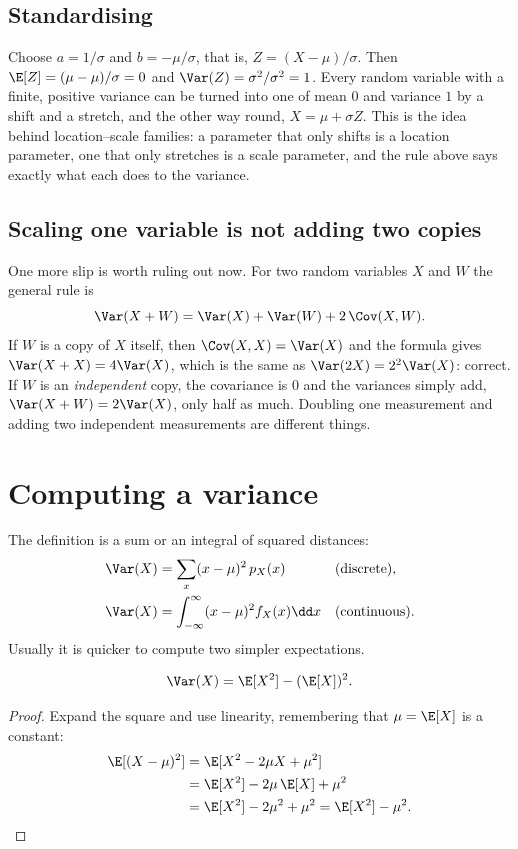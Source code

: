 \subsection{Standardising}

Choose $a=1/\sigma$ and $b=-\mu/\sigma$, that is, $Z=(X-\mu)/\sigma$. Then $\E[Z]=(\mu-\mu)/\sigma=0$ and $\Var(Z)=\sigma^2/\sigma^2=1$. Every random variable with a
finite, positive variance can be turned into one of mean $0$ and variance $1$ by a shift and a stretch, and the other way round,
$X=\mu+\sigma Z$. This is the idea behind location--scale families: a parameter that only shifts is a location parameter, one that only stretches is a scale
parameter, and the rule above says exactly what each does to the variance.

\subsection{Scaling one variable is not adding two copies}

One more slip is worth ruling out now. For two random variables $X$ and $W$ the general rule is
\[
  \Var(X+W)=\Var(X)+\Var(W)+2\,\Cov(X,W).
\]
If $W$ is a copy of $X$ itself, then $\Cov(X,X)=\Var(X)$ and the formula gives $\Var(X+X)=4\Var(X)$, which is the same as $\Var(2X)=2^2\Var(X)$: correct.
If $W$ is an \emph{independent} copy, the covariance is $0$ and the variances simply add, $\Var(X+W)=2\Var(X)$, only half as much. Doubling one measurement
and adding two independent measurements are different things.

\section{Computing a variance}

The definition is a sum or an integral of squared distances:
\begin{align*}
  \Var(X)&=\sum_{x}(x-\mu)^2\,p_X(x) &&\text{(discrete)},\\
  \Var(X)&=\int_{-\infty}^{\infty}(x-\mu)^2 f_X(x)\dd x &&\text{(continuous)}.
\end{align*}
Usually it is quicker to compute two simpler expectations.

\begin{rulebox}
\[
  \Var(X)=\E[X^2]-(\E[X])^2 .
\]
\end{rulebox}

\begin{proof}
Expand the square and use linearity, remembering that $\mu=\E[X]$ is a constant:
\begin{align*}
  \E[(X-\mu)^2]&=\E[X^2-2\mu X+\mu^2]\\
  &=\E[X^2]-2\mu\,\E[X]+\mu^2\\
  &=\E[X^2]-2\mu^2+\mu^2=\E[X^2]-\mu^2 .\qedhere
\end{align*}
\end{proof}

